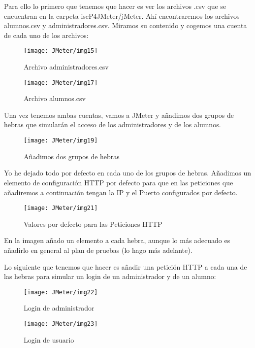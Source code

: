 Para ello lo primero que tenemos que hacer es ver los archivos .csv que se encuentran en la carpeta iseP4JMeter/jMeter. Ahí encontraremos los archivos alumnos.csv y administradores.csv. Miramos su contenido y cogemos una cuenta de cada uno de los archivos:

\begin{figure}[H]
    \centering
    \texttt{[image: JMeter/img15]}
    \caption{Archivo administradores.csv}
\end{figure}

\begin{figure}[H]
    \centering
    \texttt{[image: JMeter/img17]}
    \caption{Archivo alumnos.csv}
\end{figure}

Una vez tenemos ambas cuentas, vamos a JMeter y añadimos dos grupos de hebras que simularán el acceso de los administradores y de los alumnos.

\begin{figure}[H]
    \centering
    \texttt{[image: JMeter/img19]}
    \caption{Añadimos dos grupos de hebras}
\end{figure}

Yo he dejado todo por defecto en cada uno de los grupos de hebras. Añadimos un elemento de configuración HTTP por defecto para que en las peticiones que añadiremos a continuación tengan la IP y el Puerto configurados por defecto.

\begin{figure}[H]
    \centering
    \texttt{[image: JMeter/img21]}
    \caption{Valores por defecto para las Peticiones HTTP}
\end{figure}

En la imagen añado un elemento a cada hebra, aunque lo más adecuado es añadirlo en general al plan de pruebas (lo hago más adelante).

Lo siguiente que tenemos que hacer es añadir una petición HTTP a cada una de las hebras para simular un login de un administrador y de un alumno:

\begin{figure}[H]
    \centering
    \texttt{[image: JMeter/img22]}
    \caption{Login de administrador}
\end{figure}

\begin{figure}[H]
    \centering
    \texttt{[image: JMeter/img23]}
    \caption{Login de usuario}
\end{figure}

